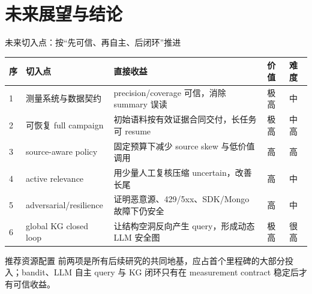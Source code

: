 \section{未来展望与结论}

\begin{frame}{未来切入点：按“先可信、再自主、后闭环”推进}
\scriptsize
\begin{tabularx}{\textwidth}{p{} p{} X p{} p{}}
\toprule
序 & 切入点 & 直接收益 & 价值 & 难度 \\
\midrule
1 & 测量系统与数据契约 & precision/coverage 可信，消除 summary 误读 & 极高 & 中 \\
2 & 可恢复 full campaign & 初始语料按有效证据合同交付，长任务可 resume & 极高 & 中高 \\
3 & source-aware policy & 固定预算下减少 source skew 与低价值调用 & 高 & 高 \\
4 & active relevance & 用少量人工复核压缩 uncertain，改善长尾 & 高 & 中 \\
5 & adversarial/resilience & 证明恶意源、429/5xx、SDK/Mongo 故障下仍安全 & 高 & 中 \\
6 & global KG closed loop & 让结构空洞反向产生 query，形成动态 LLM 安全图 & 极高 & 很高 \\
\bottomrule
\end{tabularx}

\vspace{0.7em}
\begin{block}{推荐资源配置}
前两项是所有后续研究的共同地基，应占首个里程碑的大部分投入；bandit、LLM 自主 query 与 KG 闭环只有在 measurement contract 稳定后才有可信收益。
\end{block}
\end{frame}

